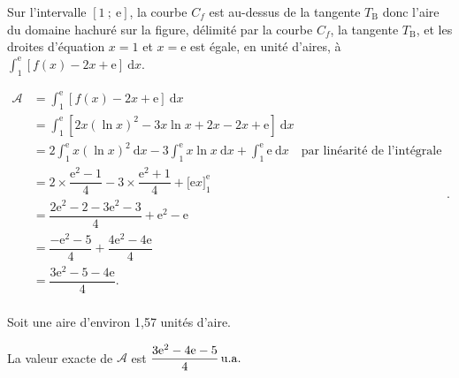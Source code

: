 \documentclass[10pt]{article}
\providecommand{\e}{{\mathrm{e}}}
\begin{document}
\begin{enumerate}
	Sur l'intervalle  $[1~;~\e]$, la courbe $C_{f}$ est au-dessus de la tangente $T_{\mathrm{B}}$ donc  l'aire du domaine hachuré sur la figure, délimité par la courbe $C_{f}$, la tangente $T_{\mathrm{B}}$, et les droites d'équation $x=1$ et $x= \e$ est égale, en unité d'aires,  à $\displaystyle \int_{1}^{\e} [f(x)-2x+\e ]~\mathrm{d} x$.

	$\begin{aligned}  \mathcal{A} &= \int_{1}^{\e} [f(x)-2x+\e] ~\mathrm{d} x\\
		&= \int_{1}^{\e} [2x(\ln x)^{2}-3x \ln x+2x -2x+\e] ~\mathrm{d} x\\
		&= 2\int_{1}^{\e} x(\ln x)^{2} ~\mathrm{d} x-3 \int_{1}^{\e} x \ln x ~\mathrm{d} x+ \int_{1}^{\e} \e  ~\mathrm{d} x \quad \text {par linéarité de l'intégrale}\\
		&= 2 \times \dfrac{\e^{2}-1}{4} - 3 \times \dfrac{\e^{2}+1}{4} + \Big[ \e x\Big]_1^{\e}\\
		&= \dfrac{2\e^2-2-3\e^2-3}{4} + \e^2-\e \\
		&= \dfrac{-\e^2-5}{4} +\dfrac{ 4\e^2-4\e}{4} \\
		&= \dfrac{3\e^2-5-4\e}{4}.\\
	\end{aligned}$.

Soit une aire d'environ 1,57 unités d'aire.

La valeur exacte de $\mathcal{A}$ est $\dfrac{3\e^2-4\e -5}{4} \,\rm{u.a.}$
\end{enumerate}

\medskip
\end{document}
